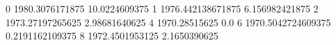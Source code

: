 0 1980.3076171875 10.0224609375
1 1976.442138671875 6.156982421875
2 1973.27197265625 2.98681640625
4 1970.28515625 0.0
6 1970.5042724609375 0.2191162109375
8 1972.4501953125 2.1650390625
